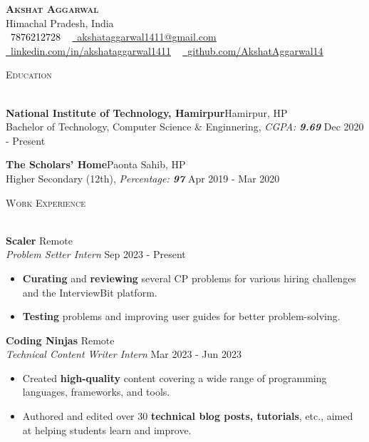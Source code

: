 \documentclass[a4paper]{article}
\newcommand{\bulletSep} { \vspace{1.5mm} }
\newcommand{\sectionSep} { \vspace{2.2mm} }
\newcommand{\lineunder} {
    \vspace*{-8pt} \\
    \hspace*{-15pt} \hrulefill \\
}
\newcommand{\header} [1] {
    {\hspace*{-18pt}\vspace*{6pt} {
        \fontfamily{qcs}\selectfont \large \scshape #1
    }}
    \vspace*{-6pt} \lineunder
    \vspace{0.5mm}
}
\newcommand{\educationItem}[5]{
    \textbf{#1}\hfill #2\\
    #3, \textit{#4} \hfill #5\\
}
\newcommand{\experienceItem}[5]{
    \textbf{#1} \hfill #2 \\
    \textit{#3} \hfill #4 \\
    \begin{itemize}
        #5
    \end{itemize}
}
\newcommand{\link}[2]{
    {\fontfamily{lmtt}\selectfont\href{#1}{#2}}
}
\begin{document}

\begin{center}
    {\textbf{\Huge \scshape Akshat Aggarwal}} \\ \vspace{1pt}
    Himachal Pradesh, India \\
    \small \textcolor{black}{\raisebox{-0.1\height}\faPhone\
        7876212728} ~ \href{mailto:akshataggarwal1411@gmail.com}{{\raisebox{-0.2\height}\faEnvelope\  \underline{akshataggarwal1411@gmail.com}}} ~
    \href{https://www.linkedin.com/in/akshataggarwal1411/}{{\raisebox{-0.2\height}\faLinkedinSquare\ \underline{linkedin.com/in/akshataggarwal1411}}}  ~
    \href{https://github.com/AkshatAggarwal14}{{\raisebox{-0.2\height}\faGithub\ \underline{github.com/AkshatAggarwal14}}}
\end{center}

\vspace{-2mm}


\header{Education}

\educationItem{National Institute of Technology, Hamirpur}{Hamirpur, HP}{Bachelor of Technology, Computer Science \& Enginnering}{CGPA: \textbf{9.69}}{Dec 2020 - Present}
\bulletSep

\educationItem{The Scholars' Home}{Paonta Sahib, HP}{Higher Secondary (12th)}{Percentage: \textbf{97}}{Apr 2019 - Mar 2020}
\sectionSep


\header{Work Experience}

\experienceItem{Scaler}{Remote}{Problem Setter Intern}{Sep 2023 - Present}{
    \item \textbf{Curating} and \textbf{reviewing} several CP problems for various hiring challenges and the InterviewBit platform.
    \item \textbf{Testing} problems and improving user guides for better problem-solving.
}
\bulletSep

\experienceItem{Coding Ninjas}{Remote}{Technical Content Writer Intern}{Mar 2023 - Jun 2023}{
    \item Created \textbf{high-quality} content covering a wide range of programming languages, frameworks, and tools.
    \item Authored and edited over 30 \textbf{technical blog posts, tutorials}, etc., aimed at helping students learn and improve.
}
\bulletSep
\end{document}
